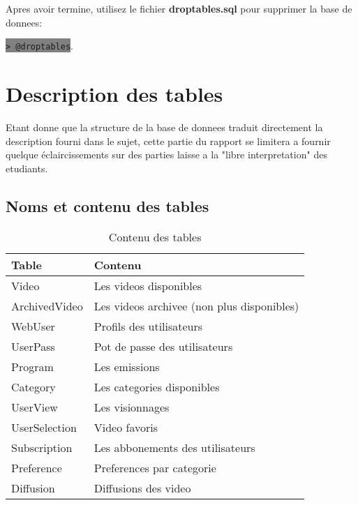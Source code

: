\documentclass[twoside,openright,a4paper,11pt,french]{article}
\begin{document}
Apres avoir termine, utilisez le fichier {\bf droptables.sql} pour supprimer
la base de donnees:
\begin{center}
\colorbox{gray}{\lstinline[basicstyle=\ttfamily\color{black}]|> @droptables|}.
\end{center}

\section{Description des tables}
Etant donne que la structure de la base de donnees traduit directement la
description fourni dans le sujet, cette partie du rapport se limitera a fournir
quelque éclaircissements sur des parties laisse a la "libre interpretation" des
etudiants.

\newpage
\subsection{Noms et contenu des tables}
\begin{table}[h]
  \centering
  \begin{tabular}{| p{5cm} | l |}
    \hline
    \textbf{Table} & \textbf{Contenu} \\
    \hline
    Video & Les videos disponibles\\
    \hline
    ArchivedVideo  & Les videos archivee (non plus disponibles)\\
    \hline
    WebUser & Profils des utilisateurs \\
    \hline
    UserPass & Pot de passe des utilisateurs \\
    \hline
    Program & Les emissions \\
    \hline
    Category & Les categories disponibles \\
    \hline
    UserView & Les visionnages \\
    \hline
    UserSelection & Video favoris \\
    \hline
    Subscription & Les abbonements des utilisateurs \\
    \hline
    Preference & Preferences par categorie \\
    \hline
    Diffusion & Diffusions des video \\
    \hline
  \end{tabular}
  \caption{Contenu des tables}
  \label{tab:tables}
\end{table}
\end{document}
